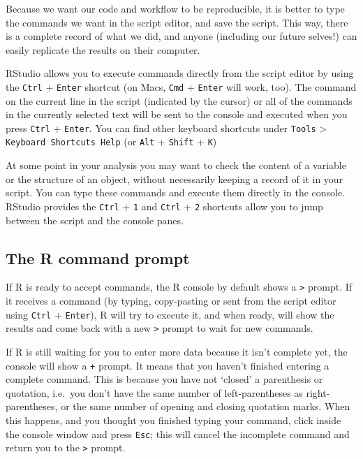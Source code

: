 \documentclass[]{book}
\theoremstyle{definition}
\theoremstyle{definition}
\theoremstyle{remark}
\begin{document}
Because we want our code and workflow to be reproducible, it is better
to type the commands we want in the script editor, and save the script.
This way, there is a complete record of what we did, and anyone
(including our future selves!) can easily replicate the results on their
computer.

RStudio allows you to execute commands directly from the script editor
by using the \texttt{Ctrl} + \texttt{Enter} shortcut (on Macs,
\texttt{Cmd} + \texttt{Enter} will work, too). The command on the
current line in the script (indicated by the cursor) or all of the
commands in the currently selected text will be sent to the console and
executed when you press \texttt{Ctrl} + \texttt{Enter}. You can find
other keyboard shortcuts under \texttt{Tools} \textgreater{}
\texttt{Keyboard\ Shortcuts\ Help} (or \texttt{Alt} + \texttt{Shift} +
\texttt{K})

At some point in your analysis you may want to check the content of a
variable or the structure of an object, without necessarily keeping a
record of it in your script. You can type these commands and execute
them directly in the console. RStudio provides the \texttt{Ctrl} +
\texttt{1} and \texttt{Ctrl} + \texttt{2} shortcuts allow you to jump
between the script and the console panes.

\subsection{The R command prompt}\label{the-r-command-prompt}

If R is ready to accept commands, the R console by default shows a
\texttt{\textgreater{}} prompt. If it receives a command (by typing,
copy-pasting or sent from the script editor using \texttt{Ctrl} +
\texttt{Enter}), R will try to execute it, and when ready, will show the
results and come back with a new \texttt{\textgreater{}} prompt to wait
for new commands.

If R is still waiting for you to enter more data because it isn't
complete yet, the console will show a \texttt{+} prompt. It means that
you haven't finished entering a complete command. This is because you
have not `closed' a parenthesis or quotation, i.e.~you don't have the
same number of left-parentheses as right-parentheses, or the same number
of opening and closing quotation marks. When this happens, and you
thought you finished typing your command, click inside the console
window and press \texttt{Esc}; this will cancel the incomplete command
and return you to the \texttt{\textgreater{}} prompt.
\end{document}

